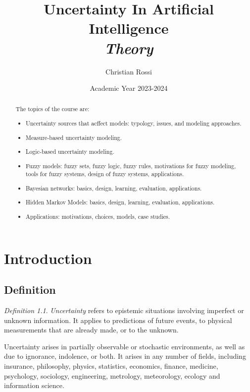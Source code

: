 \documentclass[12pt, a4paper]{report}
\title{Uncertainty In Artificial Intelligence\\ \textit{Theory}}
\author{Christian Rossi}
\date{Academic Year 2023-2024}
\theoremstyle{remark}
\newtheorem*{remark}{Definition}
\theoremstyle{definition}
\begin{document}
\maketitle

\newpage

\begin{abstract}
    The topics of the course are:
    \begin{itemize}
        \item Uncertainty sources that acffect models: typology, issues, and modeling approaches.
        \item Measure-based uncertainty modeling.
        \item Logic-based uncertainty modeling.
        \item Fuzzy models: fuzzy sets, fuzzy logic, fuzzy rules, motivations for fuzzy modeling, tools for fuzzy systems, design 
            of fuzzy systems, applications.
        \item Bayesian networks: basics, design, learning, evaluation, applications.
        \item Hidden Markov Models: basics, design, learning, evaluation, applications.
        \item Applications: motivations, choices, models, case studies.
    \end{itemize}
    \end{abstract}

\newpage

\tableofcontents

\newpage

\chapter{Introduction}
    \section{Definition}
    \begin{remark}
        \emph{Uncertainty} refers to epistemic situations involving imperfect or unknown information. It applies to predictions 
        of future events, to physical measurements that are already made, or to the unknown. 
    \end{remark}
    Uncertainty arises in partially observable or stochastic environments, as well as due to ignorance, indolence, or both. It arises 
    in any number of fields, including insurance, philosophy, physics, statistics, economics, finance, medicine, psychology, sociology, 
    engineering, metrology, meteorology, ecology and information science.
    
\end{document}
